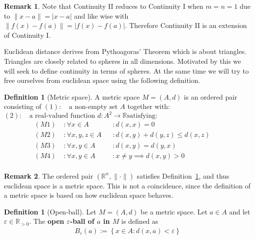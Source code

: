 \documentclass{article}
\theoremstyle{plain}
\theoremstyle{definition}
\newtheorem*{remark}{Remark}
\newtheorem{definition}[theorem]{Definition}
\newcommand{\R}{\mathbb{R}}
\begin{document}
\begin{remark}
	Note that Continuity II reduces to Continuity I when $m=n=1$ due to
	$\|x-a\|=|x-a|$ and like wise with $\|f(x)-f(a)\|=|f(x)-f(a)|$. Therefore
	Continuity II is an extension of Continuity I.
\end{remark}
Euclidean distance derives from Pythoagoras' Theorem which is about triangles.
Triangles are closely related to spheres in all dimensions. Motivated by this we
will seek to define continuity in terms of spheres. At the same time we will try
to free ourselves from euclidean space using the following definition.
\begin{definition}[Metric space]\label{def:metric space}
	A metric space $M=(A,d)$ is an ordered pair consisting of\newline
	$(1):\quad \text{a non-empty set }A$\newline
	together with:\newline
		$(2):\quad \text{a real-valued function } d:A^2\rightarrow\R \text{
		satisfying:}$
	\begin{equation}
	\begin{aligned}
		(M1)\; &:\forall x\in A &&:d(x,x)=0&&\\
		(M2)\; &:\forall x,y,z\in A &&:d(x,y)+d(y,z)\leq d(x,z)&&\\
		(M3)\; &:\forall x,y\in A &&:d(x,y)=d(y,x)&&\\
		(M4)\; &:\forall x,y\in A &&: x\neq y\implies d(x,y)>0&&\\
	\end{aligned}
	\end{equation}
\end{definition}
\begin{remark}
	The ordered pair $(\R^n,\|\cdot\|)$ satisfies
	Definition~\ref{def:metric space}, and thus euclidean space is
	a metric space. This is not a coincidence, since the definition
	of a metric space is based on how euclidean space behaves.
\end{remark}
\begin{definition}[Open-ball]\label{def:open-ball}
	Let $M=(A,d)$ be a metric space. Let $a\in A$ and let
	$\varepsilon\in\R_{>0}$. The \textbf{open $\varepsilon$-ball of $a$ in $M$}
	is defined as
	\begin{equation}
	\begin{aligned}
		B_{\varepsilon}(a):=\left\{x\in A: d(x,a)<\varepsilon\right\}
	\end{aligned}
	\end{equation}
\end{definition}
\end{document}
